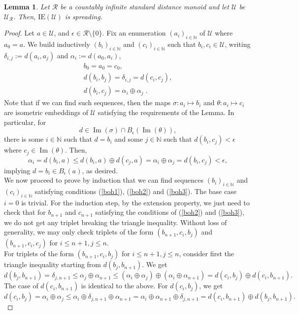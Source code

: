 \documentclass{article}
\newtheorem{lemma}[theorem]{Lemma}
\theoremstyle{remark}
\theoremstyle{definition}
\newcommand{\U}[0]{\mathbb{U}}
\renewcommand{\U}[0]{\mathcal{U}}
\DeclareMathOperator{\im}{Im}
\renewcommand\leq{\leqslant}
\newcommand{\rr}[0]{\mathcal{R}}
\newcommand{\ie}[0]{\mathrm{IE}}
\begin{document}
{{{{{\begin{lemma}\label{Urilemma2} Let $\rr$ be a countably infinite standard distance monoid and let $\U$ be $\U_{\rr}$.  Then, $\ie(\U)$ is spreading.
\end{lemma}
\begin{proof} {Let $a\in\U$, and  $\epsilon\in \rr\setminus\{0\}$.} Fix an enumeration {$(a_i)_{i\in \mathbb N}$} of $\U$ where $a_0=a$. We build inductively {$(b_i)_{i\in \mathbb N}$ and $(c_i)_{i\in \mathbb N}$} such that $b_i,c_i\in \U$, writing $\delta_{i,j}:=d(a_i, a_j)$ and $\alpha_i:=d(a_0, a_i)$,
\begin{align}
    b_0=a_0=c_0, \label{boh1}\\
   d(b_i,b_j)= \delta_{i,j} =d(c_i,c_j),\label{boh2}\\
    d(b_i, c_j)=\alpha_i\oplus \alpha_j \;. \label{boh3}
\end{align}
Note that if we can find such sequences, then the maps $\sigma:a_i\mapsto b_i$ and $\theta:a_i\mapsto c_i$ are isometric embeddings of $\U$ satisfying the requirements of the Lemma. In particular, for 
    \[d\in\im(\sigma)\cap B_\epsilon(\im(\theta)),\]
there is some $i\in \mathbb N$ such that $d=b_i$ and some $j\in \mathbb N$ such that $d(b_i, c_j)<\epsilon$ where $c_j\in \im(\theta)$. Then, 
\[\alpha_i=d(b_i, a)\leq d(b_i, a)\oplus d(c_j, a)=\alpha_i\oplus \alpha_j=d(b_i, c_j)<\epsilon,\]
implying $d=b_i\in B_{\epsilon}(a)$, as desired.\\

We {now proceed to} prove by induction that we can find sequences {$(b_i)_{i\in \mathbb N}$ and $(c_i)_{i\in \mathbb N}$} satisfying conditions (\ref{boh1}), (\ref{boh2}) and (\ref{boh3}). The base case $i=0$ is trivial. For the induction step, by {the extension property,}
we just need to check that for $b_{n+1}$ and $c_{n+1}$ satisfying the conditions of (\ref{boh2}) and (\ref{boh3}), we do not get any triplet breaking the triangle inequality. Without loss of generality, we may only check triplets of the form $(b_{n+1}, c_i, b_j)$ and $(b_{n+1}, c_i, c_j)$ for $i\leq n+1, j\leq n$.\\

For triplets of the form $(b_{n+1}, c_i, b_j)$ for $i\leq n+1, j\leq n$, consider first the triangle inequality starting from $d(b_j, b_{n+1})$. We get
\[d(b_j, b_{n+1})=\delta_{j, n+1}\leq \alpha_j\oplus \alpha_{n+1}\leq (\alpha_i\oplus \alpha_j)\oplus (\alpha_i\oplus \alpha_{n+1})=d(c_i, b_j)\oplus d(c_i, b_{n+1}).\]
The case of $d(c_i, b_{n+1})$ is identical to the above.
For $d(c_i, b_j)$, we get
\[d(c_i, b_j)=\alpha_i\oplus \alpha_j\leq \alpha_i\oplus \delta_{j, n+1}\oplus \alpha_{n+1}=\alpha_i\oplus \alpha_{n+1} \oplus \delta_{j, n+1}= d(c_i, b_{n+1})\oplus d(b_j, b_{n+1}).\]


\end{proof}}}}}}
\end{document}

